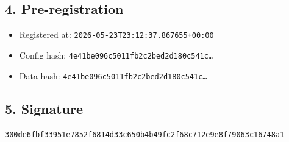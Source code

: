 \documentclass{article}
\begin{document}
\subsection*{4. Pre-registration}
\begin{itemize}
\item Registered at: \texttt{2026-05-23T23:12:37.867655+00:00}
\item Config hash: \texttt{4e41be096c5011fb2c2bed2d180c541c\dots}
\item Data hash: \texttt{4e41be096c5011fb2c2bed2d180c541c\dots}
\end{itemize}
\subsection*{5. Signature}
\texttt{300de6fbf33951e7852f6814d33c650b4b49fc2f68c712e9e8f79063c16748a1}\\
\end{document}
